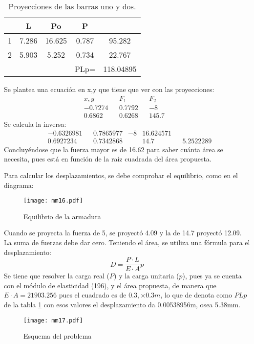 \begin{table}[h!]
  \centering
  \begin{tabular}{@{}ccccc@{}}
  \toprule
    & L     & Po     & P     &           \\ \midrule
  1 & 7.286 & 16.625 & 0.787 & 95.282    \\
  2 & 5.903 & 5.252  & 0.734 & 22.767    \\
    &       &        & PLp=  & 118.04895 \\ \bottomrule
  \end{tabular}
  \caption{Proyecciones de las barras uno y dos.}
  \label{tabmm15}
\end{table}
Se plantea una ecuación en x,y que tiene que ver con las proyecciones:
\begin{align*}
  &x,y&& F_1&&F_2&&\\
  &- 0.7274&&0.7792&&- 8\\
  &0.6862&&0.6268&&145.7
\end{align*}
Se calcula la inversa:
\begin{align*}
  &- 0.6326981&&0.7865977&- 8&16.624571\\
  &0.6927234&&0.7342868&&14.7&&5.2522289
\end{align*}
Concluyéndose que la fuerza mayor es de 16.62
para saber cuánta área se necesita, pues está en función
de la raíz cuadrada del área propuesta.

Para calcular los desplazamientos, se debe comprobar el equilibrio, como en el diagrama: 
\begin{figure}[h!]
\centering
\texttt{[image: mm16.pdf]}
\caption{Equilibrio de la armadura}
\label{mm16}
\end{figure}

Cuando se proyecta la fuerza de 5, se proyectó 4.09 y la de 14.7 proyectó 12.09.
La suma de fuerzas debe dar cero. Teniendo el área, se utiliza una fórmula para el desplazamiento:
\begin{equation}
  D = \frac{P\cdot L}{E\cdot A}p
\end{equation}
Se tiene que resolver la carga real ($P$) y la carga unitaria ($p$),
pues ya se cuenta con el módulo de elasticidad (196), y el área propuesta,
de manera que $E\cdot A= 21903.256$ pues el cuadrado es de $0.3,\times 0.3m$, lo que de denota como $PLp$ de la tabla \ref{tabmm15}
con esos valores el desplazamiento da 0.00538956m, osea 5.38mm.%
\begin{problem}
  \begin{figure}[h!]
  \centering
    \texttt{[image: mm17.pdf]}
    \caption{Esquema del problema}
    \label{mm17}
  \end{figure}
\end{problem}

